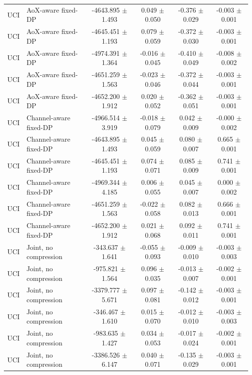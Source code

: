 \begin{table}[t]
\begin{tabular}{llcccc}
UCI & AoX-aware fixed-DP & -4643.895 $\pm$ 1.493 & 0.049 $\pm$ 0.050 & -0.376 $\pm$ 0.029 & -0.003 $\pm$ 0.001 \\
UCI & AoX-aware fixed-DP & -4645.451 $\pm$ 1.193 & 0.079 $\pm$ 0.059 & -0.372 $\pm$ 0.030 & -0.003 $\pm$ 0.001 \\
UCI & AoX-aware fixed-DP & -4974.391 $\pm$ 1.364 & -0.016 $\pm$ 0.045 & -0.410 $\pm$ 0.049 & -0.008 $\pm$ 0.002 \\
UCI & AoX-aware fixed-DP & -4651.259 $\pm$ 1.563 & -0.023 $\pm$ 0.046 & -0.372 $\pm$ 0.044 & -0.003 $\pm$ 0.001 \\
UCI & AoX-aware fixed-DP & -4652.200 $\pm$ 1.912 & 0.020 $\pm$ 0.052 & -0.362 $\pm$ 0.051 & -0.003 $\pm$ 0.001 \\
UCI & Channel-aware fixed-DP & -4966.514 $\pm$ 3.919 & -0.018 $\pm$ 0.079 & 0.042 $\pm$ 0.009 & -0.000 $\pm$ 0.002 \\
UCI & Channel-aware fixed-DP & -4643.895 $\pm$ 1.493 & 0.045 $\pm$ 0.059 & 0.080 $\pm$ 0.007 & 0.665 $\pm$ 0.001 \\
UCI & Channel-aware fixed-DP & -4645.451 $\pm$ 1.193 & 0.074 $\pm$ 0.071 & 0.085 $\pm$ 0.009 & 0.741 $\pm$ 0.001 \\
UCI & Channel-aware fixed-DP & -4969.344 $\pm$ 4.185 & 0.006 $\pm$ 0.055 & 0.045 $\pm$ 0.007 & 0.000 $\pm$ 0.002 \\
UCI & Channel-aware fixed-DP & -4651.259 $\pm$ 1.563 & -0.022 $\pm$ 0.058 & 0.082 $\pm$ 0.013 & 0.666 $\pm$ 0.001 \\
UCI & Channel-aware fixed-DP & -4652.200 $\pm$ 1.912 & 0.021 $\pm$ 0.068 & 0.092 $\pm$ 0.011 & 0.741 $\pm$ 0.001 \\
UCI & Joint, no compression & -343.637 $\pm$ 1.641 & -0.055 $\pm$ 0.093 & -0.009 $\pm$ 0.010 & -0.003 $\pm$ 0.003 \\
UCI & Joint, no compression & -975.821 $\pm$ 1.564 & 0.096 $\pm$ 0.035 & -0.013 $\pm$ 0.007 & -0.002 $\pm$ 0.001 \\
UCI & Joint, no compression & -3379.777 $\pm$ 5.671 & 0.097 $\pm$ 0.081 & -0.142 $\pm$ 0.012 & -0.003 $\pm$ 0.001 \\
UCI & Joint, no compression & -346.467 $\pm$ 1.610 & 0.015 $\pm$ 0.070 & -0.012 $\pm$ 0.010 & -0.003 $\pm$ 0.003 \\
UCI & Joint, no compression & -983.635 $\pm$ 1.427 & 0.034 $\pm$ 0.053 & -0.017 $\pm$ 0.024 & -0.002 $\pm$ 0.001 \\
UCI & Joint, no compression & -3386.526 $\pm$ 6.147 & 0.040 $\pm$ 0.071 & -0.135 $\pm$ 0.029 & -0.003 $\pm$ 0.001 \\

\end{tabular}
\end{table}
